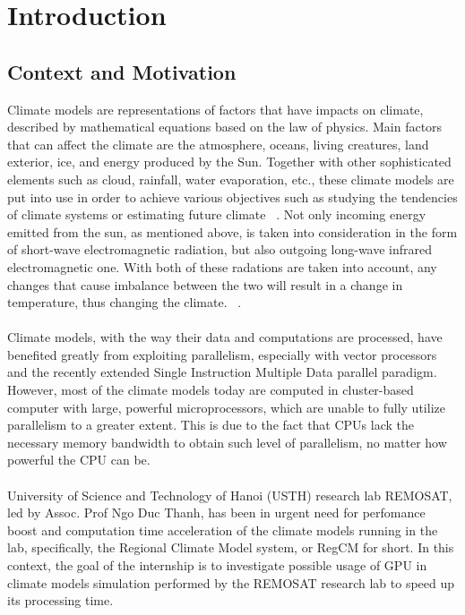 \chapter{Introduction}

\section{Context and Motivation}

Climate models are representations of factors that have impacts on climate, described by mathematical equations based on the law of physics. Main factors that can affect the climate are the atmosphere, oceans, living creatures, land exterior, ice, and energy produced by the Sun. Together with other sophisticated elements such as cloud, rainfall, water evaporation, etc., these climate models are put into use in order to achieve various objectives such as studying the tendencies of climate systems or estimating future climate ~\cite{climate_modeling}. Not only incoming energy emitted from the sun, as mentioned above, is taken into consideration in the form of short-wave electromagnetic radiation, but also outgoing long-wave infrared electromagnetic one. With both of these radations are taken into account, any changes that cause imbalance between the two will result in a change in temperature, thus changing the climate. ~\cite{jana_majumder_2011}. \\
~\\
Climate models, with the way their data and computations are processed, have benefited greatly from exploiting parallelism, especially with vector processors and the recently extended Single Instruction Multiple Data parallel paradigm. However, most of the climate models today are computed in cluster-based computer with large, powerful microprocessors, which are unable to fully utilize parallelism to a greater extent. This is due to the fact that CPUs lack the necessary memory bandwidth to obtain such level of parallelism, no matter how powerful the CPU can be.\\
~\\
University of Science and Technology of Hanoi (USTH) research lab REMOSAT, led by Assoc. Prof Ngo Duc Thanh, has been in urgent need for perfomance boost and computation time acceleration of the climate models running in the lab, specifically, the Regional Climate Model system, or RegCM for short. In this context, the goal of the internship is to investigate possible usage of GPU in climate models simulation performed by the REMOSAT research lab to speed up its processing time.\\

